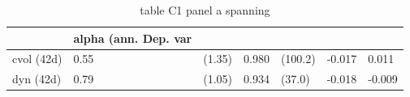 \begin{table}[htbp]
  \centering
  \caption{table C1 panel a spanning}
  \label{tab:table_C1_panel_a_spanning}
  \begin{tabular}{lllllll}
\toprule
 & alpha (ann. %
Dep. var &  &  &  &  &  &  \\
\midrule
cvol (42d) & 0.55 & (1.35) & 0.980 & (100.2) & -0.017 & 0.011 \\
dyn (42d) & 0.79 & (1.05) & 0.934 & (37.0) & -0.018 & -0.009 \\
\bottomrule
\end{tabular}

\end{table}
